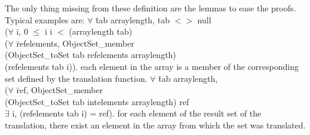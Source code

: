 The only thing missing from these definition are the lemmas to ease 
the proofs. Typical examples are: 
\btab
$\forall$ \=tab arraylength,
tab $<>$ null \rarrow \+\\
($\forall$ \=i, 0 $\le$ i \conj i $<$ (arraylength tab) \rarrow \+\\
($\forall$ \=refelements, ObjectSet\_member  \+\\
(ObjectSet\_toSet tab refelements arraylength) \\
(refelements tab i)). 
\etab
each element in the array  is a member of the corresponding set 
defined by the translation function.
\btab
$\forall$ \=tab arraylength,\+\\
($\forall$ \=ref,  ObjectSet\_member \+\\(ObjectSet\_toSet tab intelements arraylength)  ref
\rarrow \\
$\exists$ i, (refelements tab i) = ref). 
\etab
for each element of the result set of the translation, there exist an element in the 
array from which the set was translated.
